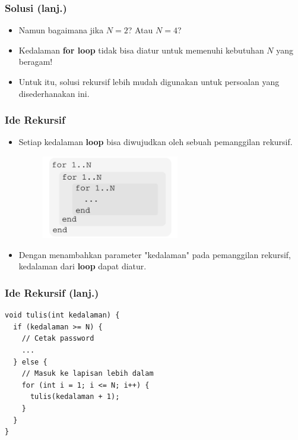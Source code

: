 \begin{frame}[fragile]
\frametitle{Solusi (lanj.)}
\begin{itemize}
  \item Namun bagaimana jika $N=2$? Atau $N=4$?
  \item Kedalaman \textbf{for loop} tidak bisa diatur untuk memenuhi kebutuhan $N$ yang beragam!
  \item Untuk itu, solusi rekursif lebih mudah digunakan untuk persoalan yang disederhanakan ini.
\end{itemize}
\end{frame}

\begin{frame}[fragile]
\frametitle{Ide Rekursif}
\begin{itemize}
  \item Setiap kedalaman \textbf{loop} bisa diwujudkan oleh sebuah pemanggilan rekursif.
  
  \begin{figure}
    \centering 
    \includegraphics[width=6cm]{asset/lapis.pdf}
  \end{figure}
  
  \item Dengan menambahkan parameter "kedalaman" pada pemanggilan rekursif, kedalaman dari \textbf{loop} dapat diatur.
\end{itemize}
\end{frame}

\begin{frame}[fragile]
\frametitle{Ide Rekursif (lanj.)}
\begin{lstlisting}
void tulis(int kedalaman) {
  if (kedalaman >= N) {
    // Cetak password
    ...
  } else {
    // Masuk ke lapisan lebih dalam
    for (int i = 1; i <= N; i++) {
      tulis(kedalaman + 1);
    }
  }
}
\end{lstlisting}
\end{frame}

